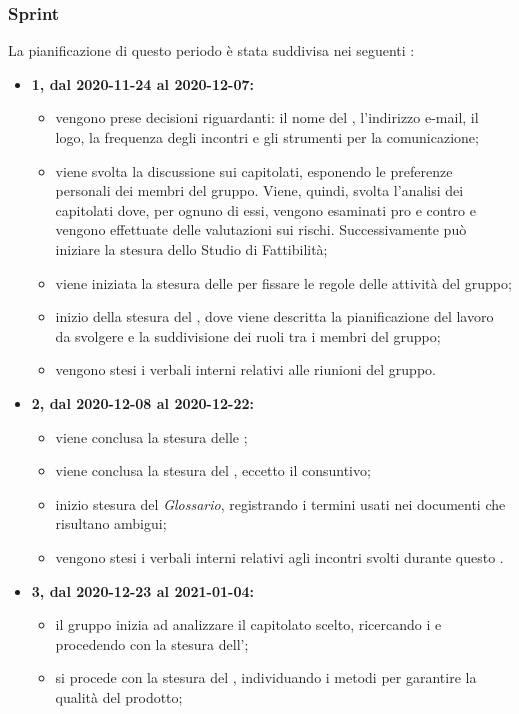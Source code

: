 \subsubsection{Sprint}
La pianificazione di questo periodo è stata suddivisa nei seguenti :
\begin{itemize}
	\item \textbf{ 1, dal 2020-11-24 al 2020-12-07:}
	\begin{itemize}
	\item vengono prese decisioni riguardanti: il nome del , l'indirizzo e-mail, il logo, la frequenza degli incontri e gli strumenti per la comunicazione;
	\item viene svolta la discussione sui capitolati, esponendo le preferenze personali dei membri del gruppo. Viene, quindi, svolta l'analisi dei capitolati dove, per ognuno di essi, vengono esaminati pro e contro e vengono effettuate delle valutazioni sui rischi. Successivamente può iniziare la stesura dello Studio di Fattibilità;
	\item viene iniziata la stesura delle \NdP{} per fissare le regole delle attività del gruppo;
	\item inizio della stesura del \PdP{}, dove viene descritta la pianificazione del lavoro da svolgere e la suddivisione dei ruoli tra i membri del gruppo;
	\item vengono stesi i verbali interni relativi alle riunioni del gruppo.
	\end{itemize}
	\item \textbf{ 2, dal 2020-12-08 al 2020-12-22:}
	\begin{itemize}
		\item viene conclusa la stesura delle \NdP{};
		\item viene conclusa la stesura del \PdP{}, eccetto il consuntivo;
		\item inizio stesura del \textit{Glossario}, registrando i termini usati nei documenti che risultano ambigui;
		\item vengono stesi i verbali interni relativi agli incontri svolti durante questo .
	\end{itemize}
	\item \textbf{ 3, dal 2020-12-23 al 2021-01-04:}
	\begin{itemize}
		\item il gruppo inizia ad analizzare il capitolato scelto, ricercando i  e procedendo con la stesura dell'\AdR{};
		\item si procede con la stesura del \PdQ{}, individuando i metodi per garantire la qualità del prodotto;

\end{itemize}
\end{itemize}
